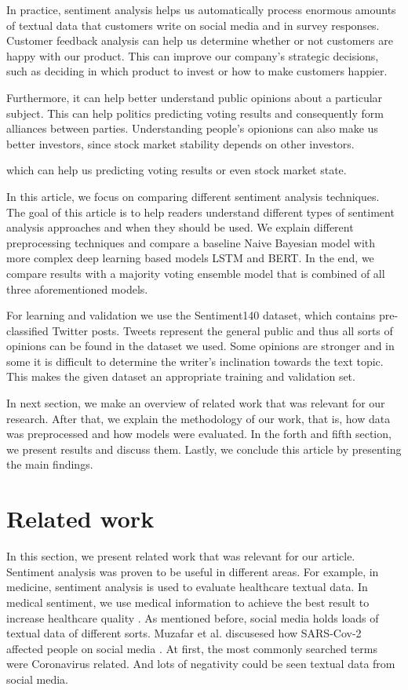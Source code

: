 \documentclass[conference]{IEEEtran}
\begin{document}
In practice, sentiment analysis helps us automatically process enormous amounts of textual data that customers write on social media and in survey responses. Customer feedback analysis can help us determine whether or not customers are happy with our product. This can improve our company's strategic decisions, such as deciding in which product to invest or how to make customers happier.

Furthermore, it can help better understand public opinions about a particular subject. This can help politics predicting voting results and consequently form alliances between parties. Understanding people's opionions can also make us better investors, since stock market stability depends on other investors.

 which can help us predicting voting results or even stock market state. 

In this article, we focus on comparing different sentiment analysis techniques. The goal of this article is to help readers understand different types of sentiment analysis approaches and when they should be used. We explain different preprocessing techniques and compare a baseline Naive Bayesian model with more complex deep learning based models LSTM and BERT. In the end, we compare results with a majority voting ensemble model that is combined of all three aforementioned models. 

For learning and validation we use the Sentiment140 dataset, which contains pre-classified Twitter posts. Tweets represent the general public and thus all sorts of opinions can be found in the dataset we used. Some opinions are stronger and in some it is difficult to determine the writer's inclination towards the text topic. This makes the given dataset an appropriate training and validation set.

In next section, we make an overview of related work that was relevant for our research. After that, we explain the methodology of our work, that is, how data was preprocessed and how models were evaluated. In the forth and fifth section, we present results and discuss them. Lastly, we conclude this article by presenting the main findings.

\section{Related work}
In this section, we present related work that was relevant for our article. Sentiment analysis was proven to be useful in different areas. For example, in medicine, sentiment analysis is used to evaluate healthcare textual data. In medical sentiment, we use medical information to achieve the best result to increase healthcare quality \cite{DENECKE201517}. As mentioned before, social media holds loads of textual data of different sorts. Muzafar et al. discusesed how SARS-Cov-2 affected people on social media \cite{covid19}. At first, the most commonly searched terms were Coronavirus related. And lots of negativity could be seen textual data from social media. 
\end{document}
